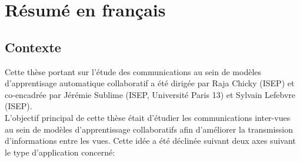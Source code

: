 \chapter{R\'{e}sum\'{e} en français}

\section{Contexte}
Cette thèse portant sur l'\'{e}tude des communications au sein de mod\`{e}les d'apprentisage automatique collaboratif a \'{e}t\'{e} dirig\'{e}e par Raja Chicky (ISEP) et co-encadr\'{e}e par J\'{e}r\'{e}mie Sublime (ISEP, Universit\'{e} Paris 13) et Sylvain Lefebvre (ISEP).\\

L'objectif principal de cette th\`{e}se \'{e}tait d'\'{e}tudier les communications inter-vues au sein de mod\`{e}les d'apprentissage collaboratifs afin d'am\'{e}liorer la transmission d'informations entre les vues. Cette id\'{e}e a \'{e}t\'{e} d\'{e}clin\'{e}e suivant deux axes suivant le type d'application concern\'{e}:\\

